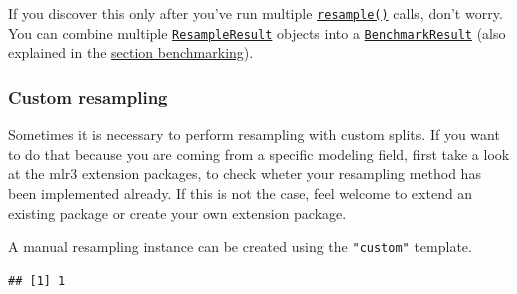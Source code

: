 \documentclass[]{article}
\newenvironment{Shaded}{\begin{snugshade}}{\end{snugshade}}
\newcommand{\DataTypeTok}[1]{\textcolor[rgb]{0.13,0.29,0.53}{#1}}
\newcommand{\DecValTok}[1]{\textcolor[rgb]{0.00,0.00,0.81}{#1}}
\newcommand{\KeywordTok}[1]{\textcolor[rgb]{0.13,0.29,0.53}{\textbf{#1}}}
\newcommand{\NormalTok}[1]{#1}
\newcommand{\OperatorTok}[1]{\textcolor[rgb]{0.81,0.36,0.00}{\textbf{#1}}}
\newcommand{\StringTok}[1]{\textcolor[rgb]{0.31,0.60,0.02}{#1}}
\renewenvironment{Shaded} {\begin{snugshade}\small} {\end{snugshade}}
\begin{document}
If you discover this only after you've run multiple \href{https://mlr3.mlr-org.com/reference/resample.html}{\texttt{resample()}} calls, don't worry.
You can combine multiple \href{https://mlr3.mlr-org.com/reference/ResampleResult.html}{\texttt{ResampleResult}} objects into a \href{https://mlr3.mlr-org.com/reference/BenchmarkResult.html}{\texttt{BenchmarkResult}} (also explained in the \protect\hyperlink{benchmarking}{section benchmarking}).

\hypertarget{resamp-custom}{%
\subsubsection{Custom resampling}\label{resamp-custom}}

Sometimes it is necessary to perform resampling with custom splits.
If you want to do that because you are coming from a specific modeling field, first take a look at the mlr3 extension packages, to check wheter your resampling method has been implemented already.
If this is not the case, feel welcome to extend an existing package or create your own extension package.

A manual resampling instance can be created using the \texttt{"custom"} template.

\begin{Shaded}
\end{Shaded}

\begin{verbatim}
## [1] 1
\end{verbatim}

\begin{Shaded}
\end{Shaded}
\end{document}
